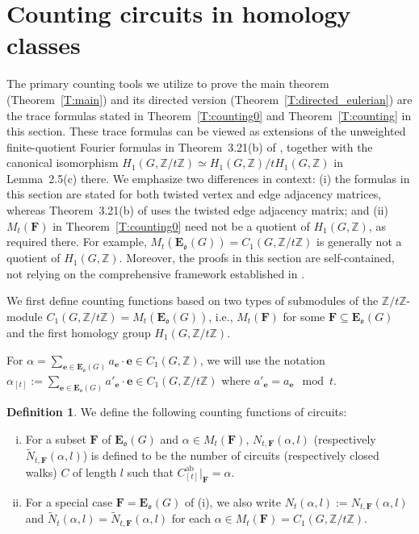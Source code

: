 \documentclass[11pt]{amsart}
\theoremstyle{plain}
\theoremstyle{definition}
\newtheorem{definition}[theorem]{Definition}
\newcommand{\mbbZ}{{\mathbb Z}}
\newcommand{\mfrako}{{\mathfrak o}}
\newcommand{\ve}{{\mathbf e}}
\newcommand{\vE}{{\mathbf E}}
\newcommand{\vF}{{\mathbf F}}
\DeclareMathOperator{\ab}{\operatorname{ab}}
\numberwithin{equation}{section}
\begin{document}
\section{Counting circuits in homology classes}
The primary counting tools we utilize to prove the main theorem (Theorem~\ref{T:main}) and its directed version (Theorem~\ref{T:directed_eulerian}) are the trace formulas stated in Theorem~\ref{T:counting0} and Theorem~\ref{T:counting} in this section. These trace formulas can be viewed as extensions of the unweighted finite-quotient Fourier formulas in Theorem~3.21(b) of \cite{LR2024spectral}, together with the canonical isomorphism $H_1(G,\mbbZ/t\mbbZ)\simeq H_1(G,\mbbZ)/t H_1(G,\mbbZ)$ in Lemma~2.5(c) there. We emphasize two differences in context: (i) the formulas in this section are stated for both twisted vertex and edge adjacency matrices, whereas Theorem~3.21(b) of \cite{LR2024spectral} uses the twisted edge adjacency matrix; and (ii) $M_t(\vF)$ in Theorem~\ref{T:counting0} need not be a quotient of $H_1(G,\mbbZ)$, as required there. For example, $M_t(\vE_\mfrako(G))=C_1(G,\mbbZ/t\mbbZ)$ is generally not a quotient of $H_1(G,\mbbZ)$.
Moreover, the proofs in this section are self-contained, not relying on the comprehensive framework established in \cite{LR2024spectral}. 

We first define counting functions based on two types of submodules of the $\mbbZ/t\mbbZ$-module $C_1(G,\mbbZ/t\mbbZ) =M_t(\vE_\mfrako(G) )$, i.e., $M_t(\vF)$ for some $\vF\subseteq \vE_\mfrako(G) $ and the first homology group $H_1(G,\mbbZ/t\mbbZ)$. 

For $\alpha = \sum_{\ve\in \vE_\mfrako(G)} a_\ve\cdot \ve \in C_1(G,\mbbZ)$, we will use the notation $\alpha_{[t]}:=\sum_{\ve\in \vE_\mfrako(G)} a'_\ve\cdot \ve \in C_1(G,\mbbZ/t\mbbZ) $ where $a'_\ve=a_\ve \mod t$. 
\begin{definition} \label{D:count-function}
We define the following counting functions of circuits:
\begin{enumerate}[(i)]
\item For a subset $\vF$ of $\vE_\mfrako(G)$ and $\alpha\in M_t(\vF)$, $N_{t,\vF}(\alpha,l)$ (respectively $\widetilde{N}_{t,\vF}(\alpha,l)$) is defined to be the number of circuits (respectively closed walks) $C$ of length $l$ such that $C^{\ab}_{[t]}|_\vF=\alpha$.
\item For a special case $\vF=\vE_\mfrako(G)$ of (i), we also write $N_t(\alpha,l):=N_{t,\vF}(\alpha,l)$ and $\widetilde{N}_t(\alpha,l)=\widetilde{N}_{t,\vF}(\alpha,l)$ for each $\alpha \in M_t(\vF)=C_1(G,\mbbZ/t\mbbZ)$. 
\end{enumerate}
\end{definition}
\end{document}
